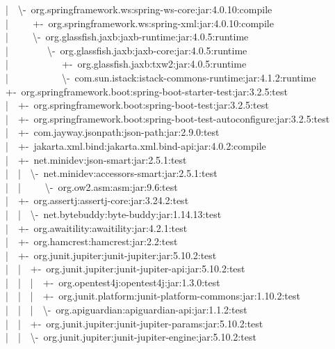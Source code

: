 |~~\textbackslash-~org.springframework.ws:spring-ws-core:jar:4.0.10:compile\\
|~~~~~+-~org.springframework.ws:spring-xml:jar:4.0.10:compile\\
|~~~~~\textbackslash-~org.glassfish.jaxb:jaxb-runtime:jar:4.0.5:runtime\\
|~~~~~~~~\textbackslash-~org.glassfish.jaxb:jaxb-core:jar:4.0.5:runtime\\
|~~~~~~~~~~~+-~org.glassfish.jaxb:txw2:jar:4.0.5:runtime\\
|~~~~~~~~~~~\textbackslash-~com.sun.istack:istack-commons-runtime:jar:4.1.2:runtime\\
+-~org.springframework.boot:spring-boot-starter-test:jar:3.2.5:test\\
|~~+-~org.springframework.boot:spring-boot-test:jar:3.2.5:test\\
|~~+-~org.springframework.boot:spring-boot-test-autoconfigure:jar:3.2.5:test\\
|~~+-~com.jayway.jsonpath:json-path:jar:2.9.0:test\\
|~~+-~jakarta.xml.bind:jakarta.xml.bind-api:jar:4.0.2:compile\\
|~~+-~net.minidev:json-smart:jar:2.5.1:test\\
|~~|~~\textbackslash-~net.minidev:accessors-smart:jar:2.5.1:test\\
|~~|~~~~~\textbackslash-~org.ow2.asm:asm:jar:9.6:test\\
|~~+-~org.assertj:assertj-core:jar:3.24.2:test\\
|~~|~~\textbackslash-~net.bytebuddy:byte-buddy:jar:1.14.13:test\\
|~~+-~org.awaitility:awaitility:jar:4.2.1:test\\
|~~+-~org.hamcrest:hamcrest:jar:2.2:test\\
|~~+-~org.junit.jupiter:junit-jupiter:jar:5.10.2:test\\
|~~|~~+-~org.junit.jupiter:junit-jupiter-api:jar:5.10.2:test\\
|~~|~~|~~+-~org.opentest4j:opentest4j:jar:1.3.0:test\\
|~~|~~|~~+-~org.junit.platform:junit-platform-commons:jar:1.10.2:test\\
|~~|~~|~~\textbackslash-~org.apiguardian:apiguardian-api:jar:1.1.2:test\\
|~~|~~+-~org.junit.jupiter:junit-jupiter-params:jar:5.10.2:test\\
|~~|~~\textbackslash-~org.junit.jupiter:junit-jupiter-engine:jar:5.10.2:test\\
